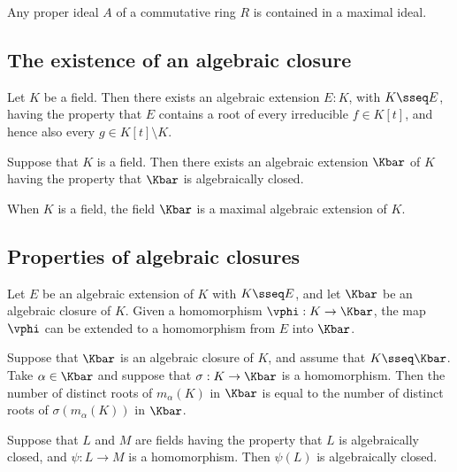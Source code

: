 \documentclass{article}
\begin{document}
  \begin{tproposition}
    Any proper ideal \( A \) of a commutative ring \( R \) is contained in a maximal ideal.
  \end{tproposition}

\subsection{The existence of an algebraic closure}
  \begin{tlemma}
    Let \( K \) be a field.
    Then there exists an algebraic extension \( E:K \), with \( K\sseq E \), having the property that \( E \) contains a root of every irreducible \( f\in K[t] \), and hence also every \( g\in K[t]\setminus K \).
  \end{tlemma}

  \begin{ttheorem}
    Suppose that \( K \) is a field.
    Then there exists an algebraic extension \( \Kbar \) of \( K \) having the property that \( \Kbar \) is algebraically closed.
  \end{ttheorem}

  \begin{tcorollary}
    When \( K \) is a field, the field \( \Kbar \) is a maximal algebraic extension of \( K \).
  \end{tcorollary}

\subsection{Properties of algebraic closures}
  \begin{ttheorem}
    Let \( E \) be an algebraic extension of \( K \) with \( K\sseq E \), and let \( \Kbar \) be an algebraic closure of \( K \).
    Given a homomorphism \( \vphi:K\to \Kbar \), the map \( \vphi \) can be extended to a homomorphism from \( E \) into \( \Kbar \).
  \end{ttheorem}

  \begin{tcorollary}
    Suppose that \( \Kbar \) is an algebraic closure of \( K \), and assume that \( K\sseq \Kbar \).
    Take \( \alpha\in \Kbar \) and suppose that \( \sigma:K\to \Kbar \) is a homomorphism.
    Then the number of distinct roots of \( m_\alpha(K) \) in \( \Kbar \) is equal to the number of distinct roots of \( \sigma(m_\alpha(K)) \) in \( \Kbar \).
  \end{tcorollary}

  \begin{tproposition}
    Suppose that \( L \) and \( M \) are fields having the property that \( L \) is algebraically closed, and \( \psi : L \to M \) is a homomorphism.
    Then \( \psi(L) \) is algebraically closed.
  \end{tproposition}
\end{document}
